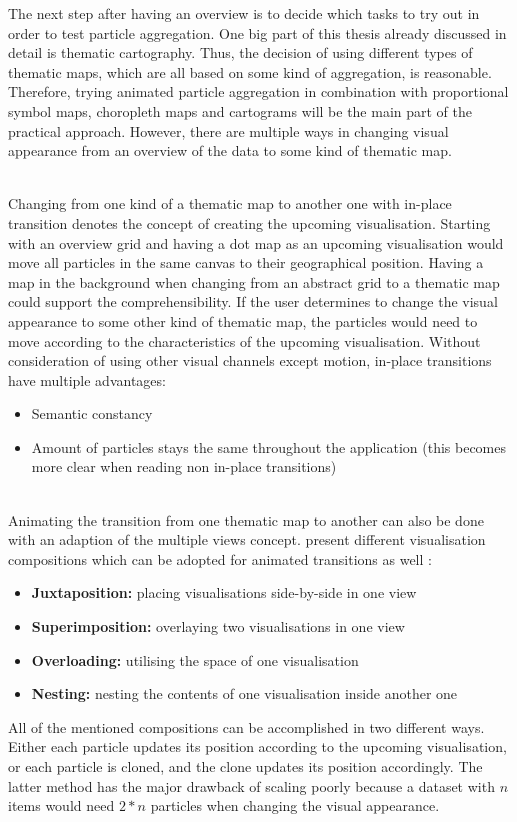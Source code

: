 The next step after having an overview is to decide which tasks to try out in order to test particle aggregation. One big part of this thesis already discussed in detail is thematic cartography. Thus, the decision of using different types of thematic maps, which are all based on some kind of aggregation, is reasonable. Therefore, trying animated particle aggregation in combination with proportional symbol maps, choropleth maps and cartograms will be the main part of the practical approach. However, there are multiple ways in changing visual appearance from an overview of the data to some kind of thematic map.

\begin{enumerate}

 \hfill \\
Changing from one kind of a thematic map to another one with in-place transition denotes the concept of creating the upcoming visualisation. Starting with an overview grid and having a dot map as an upcoming visualisation would move all particles in the same canvas to their geographical position. Having a map in the background when changing from an abstract grid to a thematic map could support the comprehensibility.
If the user determines to change the visual appearance to some other kind of thematic map, the particles would need to move according to the characteristics of the upcoming visualisation. Without consideration of using other visual channels except motion, in-place transitions have multiple advantages:
\begin{itemize}
\item Semantic constancy
\item Amount of particles stays the same throughout the application (this becomes more clear when reading non in-place transitions)
\end{itemize}

 \hfill \\
Animating the transition from one thematic map to another can also be done with an adaption of the multiple views concept. \citeauthor{Javed2012} present different visualisation compositions which can be adopted for animated transitions as well :
\begin{itemize}
\item \textbf{Juxtaposition:} placing visualisations side-by-side in one view
\item \textbf{Superimposition:} overlaying two visualisations in one view
\item \textbf{Overloading:} utilising the space of one visualisation
\item \textbf{Nesting:} nesting the contents of one visualisation inside another one
\end{itemize}

All of the mentioned compositions can be accomplished in two different ways. Either each particle updates its position according to the upcoming visualisation, or each particle is cloned, and the clone updates its position accordingly. The latter method has the major drawback of scaling poorly because a dataset with $n$ items would need $2*n$ particles when changing the visual appearance.
\end{enumerate}


